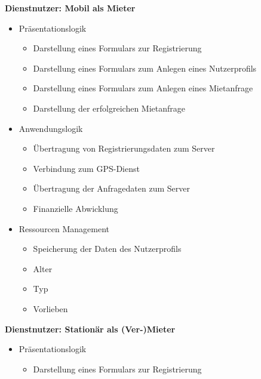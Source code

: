 \textbf{Dienstnutzer: Mobil als Mieter}
\begin{itemize}
	\item Präsentationslogik
	\begin{itemize}
  		\item Darstellung eines Formulars zur Registrierung
  		\item Darstellung eines Formulars zum Anlegen eines Nutzerprofils
  		\item Darstellung eines Formulars zum Anlegen eines Mietanfrage
  		\item Darstellung der erfolgreichen Mietanfrage
    \end{itemize}
	\item Anwendungslogik
	\begin{itemize}
  		\item Übertragung von Registrierungsdaten zum Server
  		\item Verbindung zum GPS-Dienst
  		\item Übertragung der Anfragedaten zum Server
  		\item Finanzielle Abwicklung
    \end{itemize}
	\item Ressourcen Management
	\begin{itemize}
  		\item Speicherung der Daten des Nutzerprofils
  		\item Alter
  		\item Typ
  		\item Vorlieben
	\end{itemize}
\end{itemize}

\textbf{Dienstnutzer: Stationär als (Ver-)Mieter}
\begin{itemize}
	\item Präsentationslogik
	\begin{itemize}
  		\item Darstellung eines Formulars zur Registrierung
	\end{itemize}
\end{itemize}

